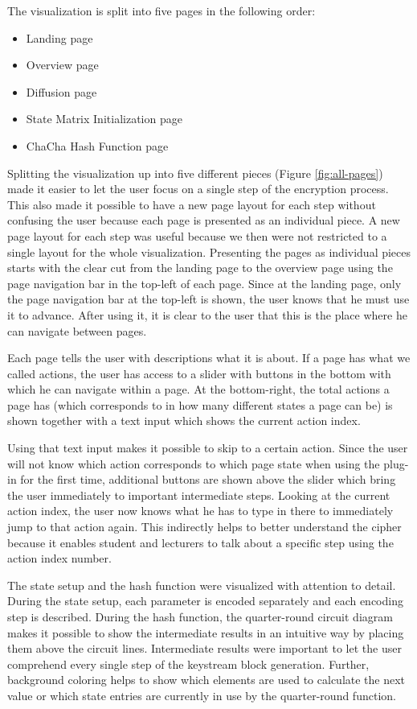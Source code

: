 \begin{enumerate}[label=(\labelenum{G}{{\arabic*}}), wide, labelwidth=!, labelindent=0pt]
     The visualization is split into five pages in the following order:
     \begin{itemize}
     \item Landing page
     \item Overview page
     \item Diffusion page
     \item State Matrix Initialization page
     \item ChaCha Hash Function page
     \end{itemize}
     Splitting the visualization up into five different pieces (Figure \ref{fig:all-pages}) made it easier to let the user focus on a single step of the encryption process. This also made it possible to have a new page layout for each step without confusing the user because each page is presented as an individual piece. A new page layout for each step was useful because we then were not restricted to a single layout for the whole visualization. Presenting the pages as individual pieces starts with the clear cut from the landing page to the overview page using the page navigation bar in the top-left of each page. Since at the landing page, only the page navigation bar at the top-left is shown, the user knows that he must use it to advance. After using it, it is clear to the user that this is the place where he can navigate between pages.
     
     Each page tells the user with descriptions what it is about. If a page has what we called actions, the user has access to a slider with buttons in the bottom with which he can navigate within a page. At the bottom-right, the total actions a page has (which corresponds to in how many different states a page can be) is shown together with a text input which shows the current action index.
     
     Using that text input makes it possible to skip to a certain action. Since the user will not know which action corresponds to which page state when using the plug-in for the first time, additional buttons are shown above the slider which bring the user immediately to important intermediate steps. Looking at the current action index, the user now knows what he has to type in there to immediately jump to that action again. This indirectly helps to better understand the cipher because it enables student and lecturers to talk about a specific step using the action index number.
     
     The state setup and the hash function were visualized with attention to detail. \\
     During the state setup, each parameter is encoded separately and each encoding step is described. During the hash function, the quarter-round circuit diagram makes it possible to show the intermediate results in an intuitive way by placing them above the circuit lines. Intermediate results were important to let the user comprehend every single step of the keystream block generation. Further, background coloring helps to show which elements are used to calculate the next value or which state entries are currently in use by the quarter-round function.
     

\end{enumerate}
